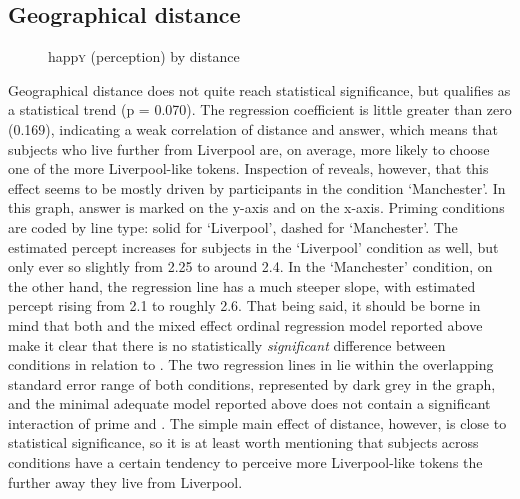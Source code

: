 \subsection{Geographical distance}
\label{sec.perc_res.happy.geography}

\begin{figure}
	
		\resizebox{.49\linewidth}{!}{} 
	\caption{happ\textsc{y} (perception) by distance}
	\label{fig.scatter.happy.ext.dist}
\end{figure}

Geographical distance does not quite reach statistical significance, but qualifies as a statistical trend (p = 0.070).
The regression coefficient is little greater than zero (0.169), indicating a weak correlation of distance and answer, which means that subjects who live further from Liverpool are, on average, more likely to choose one of the more Liverpool-like tokens.
Inspection of  reveals, however, that this effect seems to be mostly driven by participants in the  condition `Manchester'.
In this graph, answer is marked on the y-axis and  on the x-axis.
Priming conditions are coded by line type: solid for `Liverpool', dashed for `Manchester'.
The estimated percept increases for subjects in the `Liverpool' condition as well, but only ever so slightly from 2.25 to around 2.4.
In the `Manchester' condition, on the other hand, the regression line has a much steeper slope, with estimated percept rising from 2.1 to roughly 2.6.
That being said, it should be borne in mind that both  and the mixed effect ordinal regression model reported above make it clear that there is no statistically \emph{significant} difference between  conditions in relation to .
The two regression lines in  lie within the overlapping standard error range of both conditions, represented by dark grey in the graph, and the minimal adequate model reported above does not contain a significant interaction of prime and .
The simple main effect of distance, however, is close to statistical significance, so it is at least worth mentioning that subjects across conditions have a certain tendency to perceive more Liverpool-like tokens the further away they live from Liverpool.

